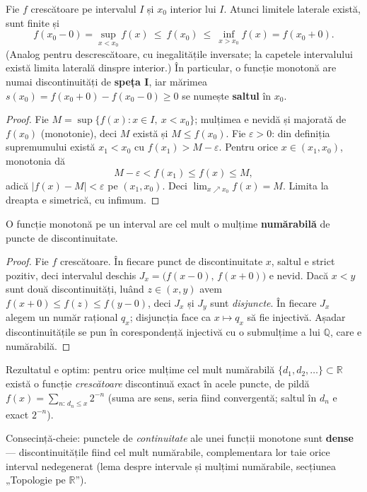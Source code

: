 \begin{teorema}
Fie $f$ crescătoare pe intervalul $I$ și $x_0$ interior lui $I$. Atunci limitele laterale există, sunt finite și
\[
f(x_0-0)=\sup_{x<x_0}f(x)\ \le\ f(x_0)\ \le\ \inf_{x>x_0}f(x)=f(x_0+0).
\]
(Analog pentru descrescătoare, cu inegalitățile inversate; la capetele intervalului există limita laterală dinspre interior.) În particular, o funcție monotonă are numai discontinuități de \textbf{speța I}, iar mărimea $s(x_0)=f(x_0+0)-f(x_0-0)\ge0$ se numește \textbf{saltul} în $x_0$.
\end{teorema}
\begin{proof}
Fie $M=\sup\{f(x):x\in I,\ x<x_0\}$; mulțimea e nevidă și majorată de $f(x_0)$ (monotonie), deci $M$ există și $M\le f(x_0)$. Fie $\varepsilon>0$: din definiția supremumului există $x_1<x_0$ cu $f(x_1)>M-\varepsilon$. Pentru orice $x\in(x_1,x_0)$, monotonia dă
\[
M-\varepsilon<f(x_1)\le f(x)\le M,
\]
adică $|f(x)-M|<\varepsilon$ pe $(x_1,x_0)$. Deci $\lim_{x\nearrow x_0}f(x)=M$. Limita la dreapta e simetrică, cu infimum.
\end{proof}

\begin{teorema}
O funcție monotonă pe un interval are cel mult o mulțime \textbf{numărabilă} de puncte de discontinuitate.
\end{teorema}
\begin{proof}
Fie $f$ crescătoare. În fiecare punct de discontinuitate $x$, saltul e strict pozitiv, deci intervalul deschis $J_x=\big(f(x-0),\,f(x+0)\big)$ e nevid. Dacă $x<y$ sunt două discontinuități, luând $z\in(x,y)$ avem $f(x+0)\le f(z)\le f(y-0)$, deci $J_x$ și $J_y$ sunt \emph{disjuncte}. În fiecare $J_x$ alegem un număr rațional $q_x$; disjuncția face ca $x\mapsto q_x$ să fie injectivă. Așadar discontinuitățile se pun în corespondență injectivă cu o submulțime a lui $\mathbb{Q}$, care e numărabilă.
\end{proof}

\begin{obs}[Optimalitate]
Rezultatul e optim: pentru orice mulțime cel mult numărabilă $\{d_1,d_2,\dots\}\subset\mathbb{R}$ există o funcție \emph{crescătoare} discontinuă exact în acele puncte, de pildă $f(x)=\sum_{n:\,d_n\le x}2^{-n}$ (suma are sens, seria fiind convergentă; saltul în $d_n$ e exact $2^{-n}$).
\end{obs}

\begin{obs}
Consecință-cheie: punctele de \emph{continuitate} ale unei funcții monotone sunt \textbf{dense} --- discontinuitățile fiind cel mult numărabile, complementara lor taie orice interval nedegenerat (lema despre intervale și mulțimi numărabile, secțiunea „Topologie pe $\mathbb{R}$'').
\end{obs}


